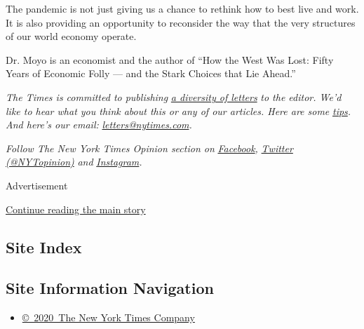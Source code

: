 The pandemic is not just giving us a chance to rethink how to best live
and work. It is also providing an opportunity to reconsider the way that
the very structures of our world economy operate.

Dr. Moyo is an economist and the author of ``How the West Was Lost:
Fifty Years of Economic Folly --- and the Stark Choices that Lie
Ahead.''

\emph{The Times is committed to publishing}
\href{https://www.nytimes.com/2019/01/31/opinion/letters/letters-to-editor-new-york-times-women.html}{\emph{a
diversity of letters}} \emph{to the editor. We'd like to hear what you
think about this or any of our articles. Here are some}
\href{https://help.nytimes.com/hc/en-us/articles/115014925288-How-to-submit-a-letter-to-the-editor}{\emph{tips}}\emph{.
And here's our email:}
\href{mailto:letters@nytimes.com}{\emph{letters@nytimes.com}}\emph{.}

\emph{Follow The New York Times Opinion section on}
\href{https://www.facebook.com/nytopinion}{\emph{Facebook}}\emph{,}
\href{http://twitter.com/NYTOpinion}{\emph{Twitter (@NYTopinion)}}
\emph{and}
\href{https://www.instagram.com/nytopinion/}{\emph{Instagram}}\emph{.}

Advertisement

\protect\hyperlink{after-bottom}{Continue reading the main story}

\hypertarget{site-index}{%
\subsection{Site Index}\label{site-index}}

\hypertarget{site-information-navigation}{%
\subsection{Site Information
Navigation}\label{site-information-navigation}}

\begin{itemize}
\tightlist
\item
  \href{https://help.nytimes.com/hc/en-us/articles/115014792127-Copyright-notice}{©~2020~The
  New York Times Company}
\end{itemize}

